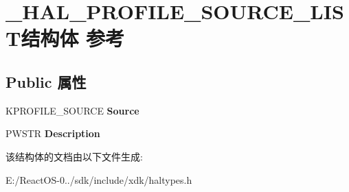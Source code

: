\hypertarget{struct___h_a_l___p_r_o_f_i_l_e___s_o_u_r_c_e___l_i_s_t}{}\section{\+\_\+\+H\+A\+L\+\_\+\+P\+R\+O\+F\+I\+L\+E\+\_\+\+S\+O\+U\+R\+C\+E\+\_\+\+L\+I\+S\+T结构体 参考}
\label{struct___h_a_l___p_r_o_f_i_l_e___s_o_u_r_c_e___l_i_s_t}
\subsection*{Public 属性}
\begin{DoxyCompactItemize}
\item 
\mbox{\label{struct___h_a_l___p_r_o_f_i_l_e___s_o_u_r_c_e___l_i_s_t_ada79c5acdfcea7d1f8846b64512a078e}} 
K\+P\+R\+O\+F\+I\+L\+E\+\_\+\+S\+O\+U\+R\+CE {\bfseries Source}
\item 
\mbox{\label{struct___h_a_l___p_r_o_f_i_l_e___s_o_u_r_c_e___l_i_s_t_a47610cc42d81c829c7e1c7eb182b7464}} 
P\+W\+S\+TR {\bfseries Description}
\end{DoxyCompactItemize}


该结构体的文档由以下文件生成\+:\begin{DoxyCompactItemize}
\item 
E\+:/\+React\+O\+S-\/0../sdk/include/xdk/haltypes.\+h\end{DoxyCompactItemize}
